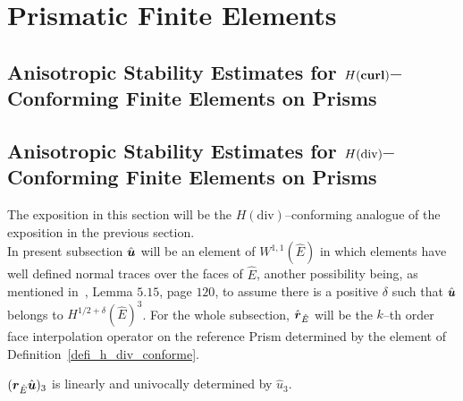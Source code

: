 \section{Prismatic Finite Elements} %
\label{sec:prismatic_finite_elements}
\subsection{Anisotropic Stability Estimates for $H(\textbf{curl})$--Conforming Finite
Elements on Prisms}
\label{stab_edge_prism}


\subsection{Anisotropic Stability Estimates for $H(\operatorname{\textrm{div}})$--Conforming Finite Elements
on Prisms} %
The exposition in this section will be the $H(\mbox{div})$--conforming analogue
of the exposition in the previous section.\\
\noindent In present subsection $\hat{\boldsymbol{u}}$ will be an element
of $W^{1,1}(\hat E)$ in which elements have well defined
normal traces over the faces of $\hat{E}$, another possibility
being, as mentioned in~\cite{monk}, Lemma $5.15$, page $120$, to assume
there is
a positive $\delta$ such that $\hat{\boldsymbol{u}}$ belongs to
$H^{1/2+\delta}(\hat{E})^3$.
For the whole subsection, $\hat{\boldsymbol{r}}_{\hat E}$ will be the $k$--th order face 
interpolation operator on the reference
Prism determined by the element of
Definition~\ref{defi_h_div_conforme}.
\label{stability_of_rt_element_in_hat_k}
\begin{lemma}\label{lemmaRT3zero}
$(\boldsymbol{r}_{\hat{E}}\hat{\boldsymbol{u}})_3$ is linearly and univocally determined by $\hat{u}_3$.
\end{lemma}
